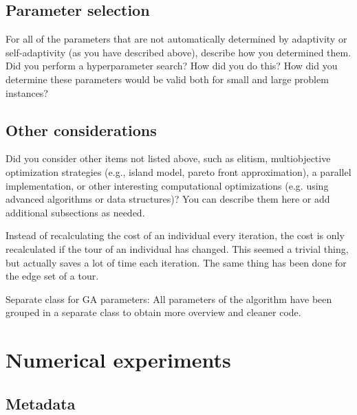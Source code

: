 \documentclass[a4paper,10pt]{article}
\newcommand{\ReplaceMe}[1]{{\color{blue}#1}}
\newcommand{\RemoveMe}[1]{{\color{purple}#1}}
\begin{document}
\subsection{Parameter selection}\label{ssec:parameters}

\ReplaceMe{For all of the parameters that are not automatically determined by adaptivity or self-adaptivity (as you have described above), describe how you determined them. Did you perform a hyperparameter search? How did you do this? How did you determine these parameters would be valid both for small and large problem instances?}

\subsection{Other considerations}\label{ssec:considerations}

\ReplaceMe{Did you consider other items not listed above, such as elitism, multiobjective optimization strategies (e.g., island model, pareto front approximation), a parallel implementation, or other interesting computational optimizations (e.g. using advanced algorithms or data structures)? You can describe them here or add additional subsections as needed.}

Instead of recalculating the cost of an individual every iteration, the cost is only recalculated if the tour of an individual has changed. This seemed a trivial thing, but actually saves a lot of time each iteration. The same thing has been done for the edge set of a tour. 

Separate class for GA parameters: All parameters of the algorithm have been grouped in a separate class to obtain more overview and cleaner code.



\section{Numerical experiments}


\subsection{Metadata}

\end{document}
